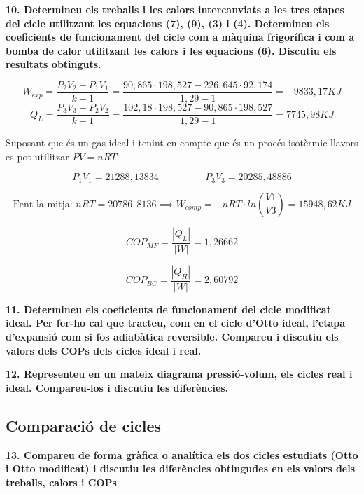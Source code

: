 \documentclass[a4paper]{article}
\begin{document}
\textbf{10. Determineu els treballs i les calors intercanviats a les tres etapes del cicle utilitzant les equacions (7), (9), (3) i (4). Determineu els coeficients de funcionament del cicle com a màquina frigorífica i com a bomba de calor utilitzant les calors i les equacions (6). Discutiu els resultats obtinguts.}

$$ W_{exp} = \frac{P_2 V_2 - P_1 V_1}{k - 1} = 
\frac{90,865·198,527 - 226,645·92,174}{1,29 - 1} = -9833,17 KJ $$
$$ Q_L = \frac{P_3 V_3 - P_2 V_2}{k - 1} = 
\frac{102,18·198,527 - 90,865·198,527}{1,29-1} = 7745,98 KJ $$

Suposant que és un gas ideal i tenint en compte que és un procés isotèrmic llavors es pot utilitzar $ PV = nRT$.

$$ P_1 V_1 = 21288,13834 \hspace{2cm} P_3 V_3 = 20285,48886 $$

$$ \text{Fent la mitja: } nRT = 20786,8136 \implies W_{comp} = -nRT·ln\left(\frac{V1}{V3}\right) = 15948,62 KJ $$

$$ COP_{MF} = \frac{|Q_L|}{|W|} = 1,26662 $$

$$ COP_{BC} = \frac{|Q_H|}{|W|} = 2,60792 $$

\textbf{11. Determineu els coeficients de funcionament del cicle modificat ideal. Per fer-ho cal que tracteu, com en el cicle d'Otto ideal, l'etapa d'expansió com si fos adiabàtica reversible. Compareu i discutiu els valors dels COPs dels cicles ideal i real.}

\textbf{12. Representeu en un mateix diagrama pressió-volum, els cicles real i ideal. Compareu-los i discutiu les diferències.}

\subsection*{Comparació de cicles}	

\textbf{13. Compareu de forma gràfica o analítica els dos cicles estudiats (Otto i Otto modificat) i discutiu les diferències obtingudes en els valors dels treballs, calors i COPs}
\end{document}
